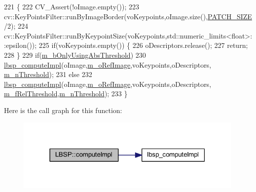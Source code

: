 \begin{DoxyCode}
221                                                                                                          \{
222     CV\_Assert(!oImage.empty());
223     cv::KeyPointsFilter::runByImageBorder(voKeypoints,oImage.size(),\mbox{\hyperlink{class_l_b_s_p_aa98abb79a155d3a2b416c2ab32e74929}{PATCH\_SIZE}}/2);
224     cv::KeyPointsFilter::runByKeypointSize(voKeypoints,std::numeric\_limits<float>::epsilon());
225     \textcolor{keywordflow}{if}(voKeypoints.empty()) \{
226         oDescriptors.release();
227         \textcolor{keywordflow}{return};
228     \}
229     \textcolor{keywordflow}{if}(\mbox{\hyperlink{class_l_b_s_p_a5f49537c70502b73f32038218a4f8371}{m\_bOnlyUsingAbsThreshold}})
230         \mbox{\hyperlink{_l_b_s_p_8cpp_abb90115b7341a5b5d8f5413b31618b79}{lbsp\_computeImpl}}(oImage,\mbox{\hyperlink{class_l_b_s_p_a8c5ccb37124c8fa457db0ba9dbe28c18}{m\_oRefImage}},voKeypoints,oDescriptors,
      \mbox{\hyperlink{class_l_b_s_p_aa1c90eb308a5ff277df09c4da186693a}{m\_nThreshold}});
231     \textcolor{keywordflow}{else}
232         \mbox{\hyperlink{_l_b_s_p_8cpp_abb90115b7341a5b5d8f5413b31618b79}{lbsp\_computeImpl}}(oImage,\mbox{\hyperlink{class_l_b_s_p_a8c5ccb37124c8fa457db0ba9dbe28c18}{m\_oRefImage}},voKeypoints,oDescriptors,
      \mbox{\hyperlink{class_l_b_s_p_a99fbb83c842782bb5621a43efb7580d5}{m\_fRelThreshold}},\mbox{\hyperlink{class_l_b_s_p_aa1c90eb308a5ff277df09c4da186693a}{m\_nThreshold}});
233 \}
\end{DoxyCode}
Here is the call graph for this function\+:\nopagebreak
\begin{figure}[H]
\begin{center}
\leavevmode
\includegraphics[width=315pt]{class_l_b_s_p_a1a9b0613104169b3cdf567f7625c7fc4_cgraph}
\end{center}
\end{figure}
\mbox{\label{class_l_b_s_p_a27a44cb6f6e3015ee26047bd3d84f892}} 
